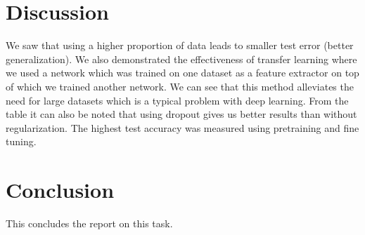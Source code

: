 \documentclass[11pt]{article}
\begin{document}
\section{Discussion}
We saw that using a higher proportion of data leads to smaller test error (better generalization). 
We also demonstrated the effectiveness of transfer learning where we used a network which was trained on 
one dataset as a feature extractor on top of which we trained another network. We can see that this 
method alleviates the need for large datasets which is a typical problem with deep learning. 
From the table it can also be noted that using dropout gives us better results than without regularization.
The highest test accuracy was measured using pretraining and fine tuning.


\section{Conclusion}
This concludes the report on this task.
\end{document}
